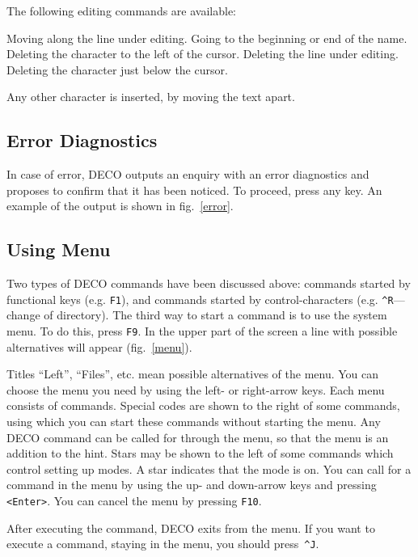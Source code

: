 The following editing commands are available:
\begin{example}
\litem{$\leftarrow$, $\rightarrow$}
Moving along the line under editing.
Going to the beginning or end of the name.
Deleting the character to the left of the cursor.
Deleting the line under editing.
Deleting the character just below the cursor.
\end{example}
Any other character is inserted, by moving the text apart.

\subsection{Error Diagnostics}


In case of error, DECO outputs an enquiry with an
error diagnostics and proposes to confirm that it has 
been noticed. To proceed, press any key. An example 
of the output is shown in fig.~\ref{error}.

\subsection{Using Menu}

Two types of DECO commands have been discussed above:
commands started by functional keys (e.g. {\tt F1}), and commands started by
control-characters (e.g. {\tt \^{}R}---change of
directory). The third way to start a command is to use
the system menu. To do this, press {\tt F9}. In the upper
part of the screen a line with possible alternatives will 
appear (fig.~\ref{menu}).
 

Titles ``Left'', ``Files'', etc. mean possible alternatives of the menu.
You can choose the menu you need by using the left-
or right-arrow keys. Each menu consists of
commands. Special codes are shown to the right of 
some commands, using which you can start these 
commands without starting the menu. Any DECO 
command can be called for through the menu, so that 
the menu is an addition to the hint. Stars may be shown to
the left of some commands which control setting up modes.
A star indicates that the mode is on. You can
call for a command in the menu by using the up- and down-arrow keys
and pressing {\tt <Enter>}. You can cancel the menu by pressing {\tt F10}.

After executing the command, DECO exits from the menu.
If you want to execute a command, staying in the menu,
you should press~{\tt \^{}J}.


